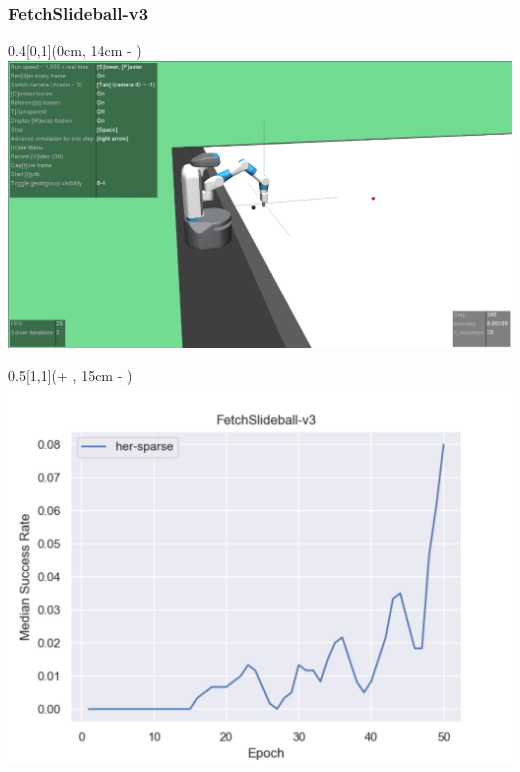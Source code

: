 


\begin{frame}
	\frametitle{FetchSlideball-v3}	
	\vspace{1cm}
	
	\begin{textblock*}{0.4\paperwidth}[0,1](0cm, 14cm - \PraesentationSeitenrand)%
		\includegraphics[width=0.4\paperwidth]{./Ressourcen/Figures/FetchSlideball-v3.pdf}
	\end{textblock*}
	
	\begin{textblock*}{0.5\paperwidth}[1,1](\textwidth + \PraesentationSeitenrand, 15cm - \PraesentationSeitenrand)%
		\includegraphics[width=0.5\paperwidth]{./Ressourcen/Figures/fig_FetchSlideball-v3.pdf}
	\end{textblock*}
	
\end{frame}
\clearpage


